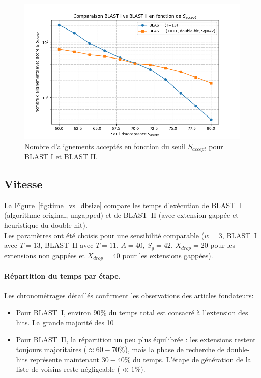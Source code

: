 \documentclass[conference]{IEEEtran}
\begin{document}
\begin{figure}
    \centering
    \includegraphics[width=\linewidth]{test_nb_alignments.png}
    \caption{Nombre d'alignements acceptés en fonction du seuil $S_{accept}$ pour BLAST I et BLAST II.}
    \label{fig:nb_alignments}
\end{figure}

\subsection{Vitesse}

La Figure~\ref{fig:time_vs_dbsize} compare les temps d’exécution de BLAST~I (algorithme original, ungapped) et de BLAST~II (avec extension gappée et heuristique du double-hit).\\
Les paramètres ont été choisis pour une sensibilité comparable ($w=3$, BLAST~I avec $T=13$, BLAST~II avec $T=11$, $A=40$, $S_g=42$, $X_{drop}=20$ pour les extensions non gappées et $X_{drop}=40$ pour les extensions gappées).\\

\paragraph*{Répartition du temps par étape.}
Les chronométrages détaillés confirment les observations des articles fondateurs:
\begin{itemize}
    \item Pour BLAST~I, environ $90\%$ du temps total est consacré à l’extension des hits. La grande majorité des 10%
    \item Pour BLAST~II, la répartition un peu plus équilibrée : les extensions restent toujours majoritaires ($\approx 60-70\%$), mais la phase de recherche de double-hits représente maintenant $30-40\%$ du temps. L’étape de génération de la liste de voisins reste négligeable ($\ll 1\%$).
\end{itemize}
\end{document}
